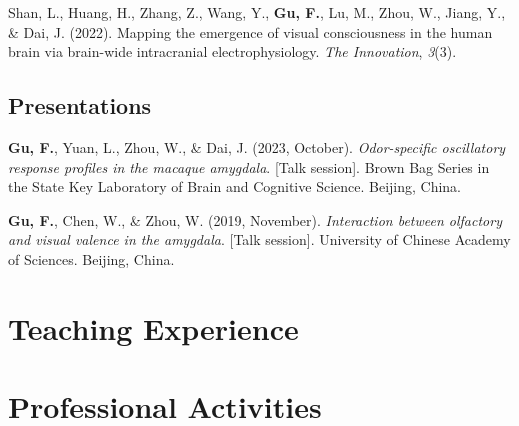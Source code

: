 \documentclass[11pt,a4paper,]{awesome-cv}
\newlength{\cslhangindent}
\newenvironment{CSLReferences}[2] %
 {\begin{list}{}{%
  \setlength{\itemindent}{0pt}
  \setlength{\leftmargin}{0pt}
  \setlength{\parsep}{0pt}
  \ifodd #1
   \setlength{\leftmargin}{\cslhangindent}
   \setlength{\itemindent}{-1\cslhangindent}
  \fi
  \setlength{\itemsep}{#2\baselineskip}}}
 {\end{list}}
\begin{document}
\label{refs-4e2356d0f68c573869fb2c3d757cff6e}
\begin{CSLReferences}{1}{0}
Shan, L., Huang, H., Zhang, Z., Wang, Y., \textbf{Gu, F.}, Lu, M., Zhou,
W., Jiang, Y., \& Dai, J. (2022). Mapping the emergence of visual
consciousness in the human brain via brain-wide intracranial
electrophysiology. \emph{The Innovation}, \emph{3}(3).

\end{CSLReferences}

\subsection{Presentations}\label{presentations}

\label{refs-a6103ad59703c9ce34569450f5e90894}
\begin{CSLReferences}{1}{0}
\textbf{Gu, F.}, Yuan, L., Zhou, W., \& Dai, J. (2023, October).
\emph{Odor-specific oscillatory response profiles in the macaque
amygdala}. {[}Talk session{]}. Brown Bag Series in the State Key
Laboratory of Brain and Cognitive Science. Beijing, China.

\end{CSLReferences}

\label{refs-6db8de78c1b7b9f933a8afcd4e1bec59}
\begin{CSLReferences}{1}{0}
\textbf{Gu, F.}, Chen, W., \& Zhou, W. (2019, November).
\emph{Interaction between olfactory and visual valence in the amygdala}.
{[}Talk session{]}. University of Chinese Academy of Sciences. Beijing,
China.

\end{CSLReferences}

\section{Teaching Experience}\label{teaching-experience}

\begin{cventries}
    \vspace{-4.0mm}
    \vspace{-4.0mm}
\end{cventries}

\section{Professional Activities}\label{professional-activities}
\end{document}
